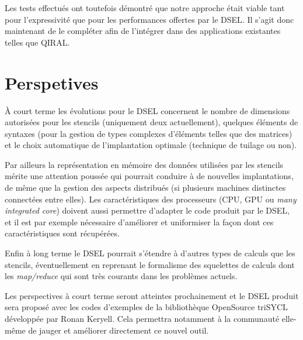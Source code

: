 Les tests effectués ont toutefois démontré que notre approche était viable tant pour l'expressivité que pour les performances offertes par le DSEL. Il s'agit donc maintenant de le compléter afin de l'intégrer dans des applications existantes telles que \textsf{QIRAL}.

\section{Perspetives}

À court terme les évolutions pour le DSEL concernent le nombre de dimensions autorisées pour les stencils (uniquement deux actuellement), quelques éléments de syntaxes (pour la gestion de types complexes d'éléments telles que des matrices) et le choix automatique de l'implantation optimale (technique de tuilage ou non).

Par ailleurs la représentation en mémoire des données utilisées par les stencils mérite une attention poussée qui pourrait conduire à de nouvelles implantations, de même que la gestion des aspects distribués (si plusieurs machines distinctes connectées entre elles). Les caractéristiques des  processeurs (CPU, GPU ou \emph{many integrated core}) doivent aussi permettre d'adapter le code produit par le DSEL, et il est par exemple nécessaire d'améliorer et uniformiser la façon dont ces caractéristiques sont récupérées.

Enfin à long terme le DSEL pourrait s'étendre à d'autres types de calculs que les stencils, éventuellement en reprenant le formalisme des squelettes de calculs dont les \emph{map/reduce} qui sont très courants dans les problèmes actuels.

Les perspectives à court terme seront atteintes prochainement et le DSEL produit sera proposé avec les codes d'exemples de la bibliothèque OpenSource \textsf{triSYCL} développée par Ronan Keryell. Cela permettra notamment à la communauté elle-même de jauger et améliorer directement ce nouvel outil. 


